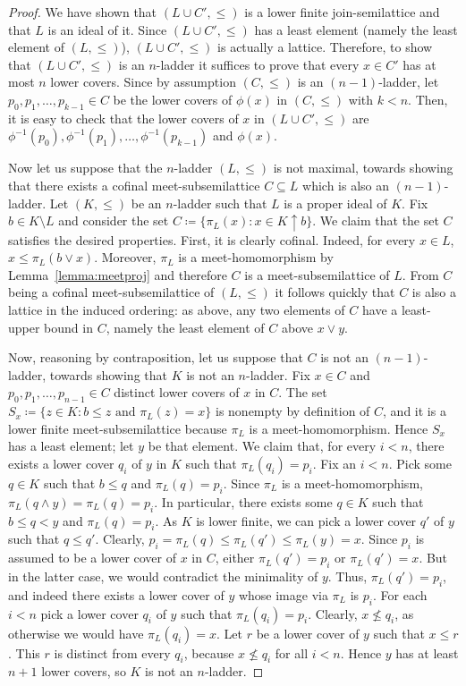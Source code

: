 \documentclass[]{amsart}
\theoremstyle{definition}
\theoremstyle{remark}
\begin{document}
\begin{proof}
We have shown that $(L \cup C', \le)$ is a lower finite join-semilattice and that $L$ is an ideal of it. Since $(L \cup C', \le)$ has a least element (namely the least element of $(L, \le)$), $(L \cup C', \le)$ is actually a lattice. Therefore, to show that $(L \cup C', \le)$ is an $n$-ladder it suffices to prove that every $x \in C'$ has at most $n$ lower covers. Since by assumption $(C, \le)$ is an $(n-1)$-ladder, let $p_0, p_1, \dots, p_{k-1} \in C$ be the lower covers of $\phi(x)$ in $(C, \le)$ with $k < n$. Then, it is easy to check that the lower covers of $x$ in $(L \cup C', \le)$ are $\phi^{-1}(p_0), \phi^{-1}(p_1), \dots, \phi^{-1}(p_{k-1})$ and $\phi(x)$. 

Now let us suppose that the $n$-ladder $(L, \le)$ is not maximal, towards showing that there exists a cofinal meet-subsemilattice $C \subseteq L$ which is also an $(n-1)$-ladder. Let $(K, \le)$ be an $n$-ladder such that $L$ is a proper ideal of $K$. Fix $b \in K \setminus L$ and consider the set $C \coloneqq \big\{\pi_L(x) : x \in K \uparrow b\big\}$. We claim that the set $C$ satisfies the desired properties. First, it is clearly cofinal. Indeed, for every $x \in L$, $x \le \pi_L(b \vee x)$. Moreover, $\pi_L$ is a meet-homomorphism by Lemma~\ref{lemma:meetproj} and therefore $C$ is a meet-subsemilattice of $L$. From $C$ being a cofinal meet-subsemilattice of $(L, \le)$ it follows quickly that $C$ is also a lattice in the induced ordering: as above, any two elements of $C$ have a least-upper bound in $C$, namely the least element of $C$ above $x \vee y$.

Now, reasoning by contraposition, let us suppose that $C$ is not an $(n-1)$-ladder, towards showing that $K$ is not an $n$-ladder. Fix $x \in C$ and $p_0,p_1,\dots, p_{n-1} \in C$ distinct lower covers of $x$ in $C$. The set $S_x \coloneqq \{z \in K : b \le z \text{ and } \pi_L(z) = x\}$ is nonempty by definition of $C$, and it is a lower finite meet-subsemilattice because $\pi_L$ is a meet-homomorphism. Hence $S_x$ has a least element; let $y$ be that element. We claim that, for every $i < n$, there exists a lower cover $q_i$ of $y$ in $K$ such that $\pi_L(q_i) = p_i$. Fix an $i < n$. Pick some $q \in K$ such that $b \le q$ and $\pi_L(q) = p_i$. Since $\pi_L$ is a meet-homomorphism, $\pi_L(q \wedge y) = \pi_L(q) = p_i$. In particular, there exists some $q \in K$ such that $b \le q < y$ and $\pi_L(q) = p_i$. As $K$ is lower finite, we can pick a lower cover $q'$ of $y$ such that $q \le q'$. Clearly, $p_i =  \pi_L(q) \le \pi_L(q') \le \pi_L(y) = x$. Since $p_i$ is assumed to be a lower cover of $x$ in $C$, either $\pi_L(q') = p_i$ or $\pi_L(q') = x$. But in the latter case, we would contradict the minimality of $y$. Thus, $\pi_L(q') = p_i$, and indeed there exists a lower cover of $y$ whose image via $\pi_L$ is $p_i$. For each $i < n$ pick a lower cover $q_i$ of $y$ such that $\pi_L(q_i) = p_i$. Clearly, $x \not\le q_i$, as otherwise we would have $\pi_L(q_i) = x$. Let $r$ be a lower cover of $y$ such that $x \le r$. This $r$ is distinct from every $q_i$, because $x \not\le q_i$ for all $i < n$. Hence $y$ has at least $n+1$ lower covers, so $K$ is not an $n$-ladder.
\end{proof}
\end{document}
